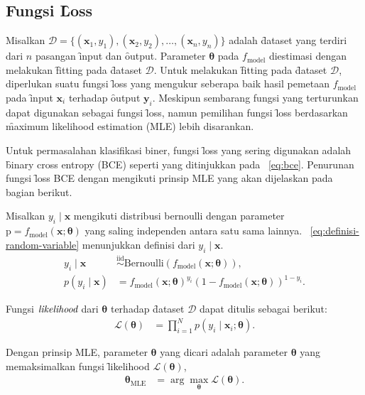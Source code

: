     \subsection{Fungsi \f{Loss}}
    Misalkan $\mathcal{D} = \{(\mathbf{x}_1, y_1), (\mathbf{x}_2, y_2), \dots, (\mathbf{x}_n, y_n)\}$ adalah \f{dataset} yang terdiri dari $n$ pasangan \f{input} dan \f{output}. Parameter $\bm{\theta}$ pada $f_{\text{model}}$ diestimasi dengan melakukan \f{fitting} pada \f{dataset} $\mathcal{D}$. Untuk melakukan \f{fitting} pada \f{dataset} $\mathcal{D}$, diperlukan suatu fungsi \f{loss} yang mengukur seberapa baik hasil pemetaan $f_{\text{model}}$ pada \f{input} $\mathbf{x}_i$ terhadap \f{output} $\mathbf{y}_i$. Meskipun sembarang fungsi yang terturunkan dapat digunakan sebagai fungsi \f{loss}, namun pemilihan fungsi \f{loss} berdasarkan \f{maximum likelihood estimation} (MLE) lebih disarankan. 
    
    Untuk permasalahan klasifikasi biner, fungsi \f{loss} yang sering digunakan adalah \f{binary cross entropy} (BCE) seperti yang ditinjukkan pada \equ~\ref{eq:bce}. Penurunan fungsi \f{loss} BCE dengan mengikuti prinsip MLE yang akan dijelaskan pada bagian berikut.
    
    Misalkan $y_i \mid \mathbf{x}$ mengikuti distribusi bernoulli dengan parameter $\text{p} = f_{\text{model}}(\mathbf{x};\bm{\theta})$ yang saling independen antara satu sama lainnya. \equ~\ref{eq:definisi-random-variable} menunjukkan definisi dari $y_i \mid \mathbf{x}$.
    \begin{align}
        \label{eq:definisi-random-variable}
        y_i \mid \mathbf{x} &\overset{\text{iid}}{\sim} \text{Bernoulli}(f_{\text{model}}(\mathbf{x};\bm{\theta})), \\
        p(y_i \mid \mathbf{x}) &= f_{\text{model}}(\mathbf{x};\bm{\theta})^{y_i} (1 - f_{\text{model}}(\mathbf{x};\bm{\theta}))^{1 - y_i}.
    \end{align} 

    Fungsi $\textit{likelihood}$ dari $\bm{\theta}$ terhadap \f{dataset} $\mathcal{D}$ dapat ditulis sebagai berikut:
    \begin{align}
        \mathcal{L}(\bm{\theta}) &= \prod_{i=1}^N p(y_i \mid \mathbf{x}_i; \bm{\theta}).
    \end{align}

    Dengan prinsip MLE, parameter $\bm{\theta}$ yang dicari adalah parameter $\bm{\theta}$ yang memaksimalkan fungsi \f{likelihood} $\mathcal{L}(\bm{\theta})$,
    \begin{align}
        \bm{\theta}_{\text{MLE}} &= \arg\max_{\bm{\theta}} \mathcal{L}(\bm{\theta}).
    \end{align}

